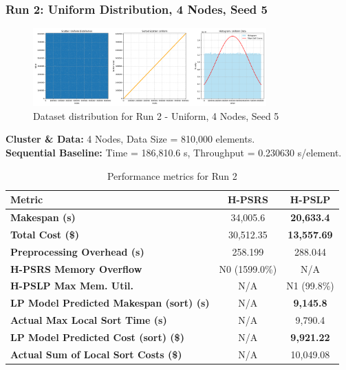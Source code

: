 \documentclass[]{interact}
\theoremstyle{plain}
\theoremstyle{definition}
\theoremstyle{remark}
\begin{document}
\subsubsection{Run 2: Uniform Distribution, 4 Nodes, Seed 5}

\begin{figure}[H]
    \centering
    \includegraphics[width=0.8\textwidth]{src/out/2run_4node_5seed_uniform.png}
    \caption{Dataset distribution for Run 2 - Uniform, 4 Nodes, Seed 5}
    \label{fig:run2_dist}
\end{figure}

\textbf{Cluster \& Data:} 4 Nodes, Data Size = 810,000 elements.\\
\textbf{Sequential Baseline:} Time = 186,810.6 \textmu{}s, Throughput = 0.230630 \textmu{}s/element.

\begin{table}[H]
\centering
\caption{Performance metrics for Run 2}
\label{tab:run2}
\begin{tabular}{@{}lcc@{}}
\toprule
\textbf{Metric} & \textbf{H-PSRS} & \textbf{H-PSLP} \\
\midrule
\textbf{Makespan (\textmu{}s)} & 34,005.6 & \textbf{20,633.4} \\
\textbf{Total Cost (\$)} & 30,512.35 & \textbf{13,557.69} \\
\textbf{Preprocessing Overhead (\textmu{}s)} & 258.199 & 288.044 \\
\textbf{H-PSRS Memory Overflow} & N0 (1599.0\%) & N/A \\
\textbf{H-PSLP Max Mem. Util.} & N/A & N1 (99.8\%) \\
\textbf{LP Model Predicted Makespan (sort) (\textmu{}s)} & N/A & \textbf{9,145.8} \\
\textbf{Actual Max Local Sort Time (\textmu{}s)} & N/A & 9,790.4 \\
\textbf{LP Model Predicted Cost (sort) (\$)} & N/A & \textbf{9,921.22} \\
\textbf{Actual Sum of Local Sort Costs (\$)} & N/A & 10,049.08 \\
\bottomrule
\end{tabular}
\end{table}
\end{document}
